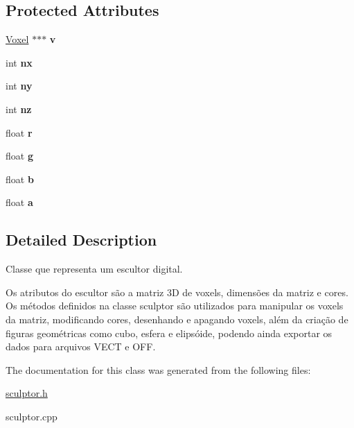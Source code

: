\subsection*{Protected Attributes}
\begin{DoxyCompactItemize}
\item 
\mbox{\label{classSculptor_a4ca53a2f2fbf41ca42dfe729ebe693f1}} 
\mbox{\hyperlink{structVoxel}{Voxel}} $\ast$$\ast$$\ast$ {\bfseries v}
\item 
\mbox{\label{classSculptor_ad1e32f9042538419a3bc7b376f7813b8}} 
int {\bfseries nx}
\item 
\mbox{\label{classSculptor_a1ce2ff97ec94927928ab3f5ec4ba6761}} 
int {\bfseries ny}
\item 
\mbox{\label{classSculptor_a33204e7df26a7ee4c7192381a24335d3}} 
int {\bfseries nz}
\item 
\mbox{\label{classSculptor_a3f5d2ec3b66d645019b8d81c810a1cd8}} 
float {\bfseries r}
\item 
\mbox{\label{classSculptor_a208c06af69a81a1568df4493868816f1}} 
float {\bfseries g}
\item 
\mbox{\label{classSculptor_a7aafd7305ea634252d8288b60536cd96}} 
float {\bfseries b}
\item 
\mbox{\label{classSculptor_a6fd0157dcf17582f0edd5fddf157604e}} 
float {\bfseries a}
\end{DoxyCompactItemize}


\subsection{Detailed Description}
Classe que representa um escultor digital. 

Os atributos do escultor são a matriz 3D de voxels, dimensões da matriz e cores. Os métodos definidos na classe sculptor são utilizados para manipular os voxels da matriz, modificando cores, desenhando e apagando voxels, além da criação de figuras geométricas como cubo, esfera e elipsóide, podendo ainda exportar os dados para arquivos V\+E\+CT e O\+FF. 

The documentation for this class was generated from the following files\+:\begin{DoxyCompactItemize}
\item 
\mbox{\hyperlink{sculptor_8h}{sculptor.\+h}}\item 
sculptor.\+cpp\end{DoxyCompactItemize}
